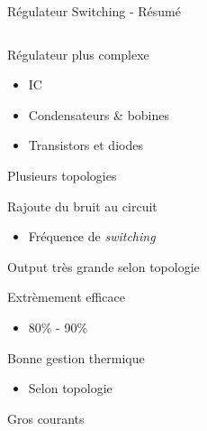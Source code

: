 \begin{frame}{Régulateur Switching - Résumé}
    \begin{columns}
        \begin{column}{0.6\textwidth}
            \vspace{-12pt}
            \begin{itemize}
                \item<1-> Régulateur plus complexe
                \begin{itemize}
                    \item<1-> IC
                    \item<1-> Condensateurs \& bobines
                    \item<1-> Transistors et diodes
                \end{itemize}
                \item<1-> Plusieurs topologies
                \item<2-> Rajoute du bruit au circuit
                \begin{itemize}
                    \item<2-> Fréquence de \textit{switching}
                \end{itemize}
                \item<3-> Output très grande selon topologie
                \item<4-> Extrèmement efficace
                \begin{itemize}
                    \item<4-> 80\% - 90\%
                \end{itemize}
                 {
                \item Bonne gestion thermique
                \begin{itemize}
                    \item Selon topologie
                \end{itemize}
                \item Gros courants
                }
            \end{itemize}
        \end{column}


\end{columns}
\end{frame}
